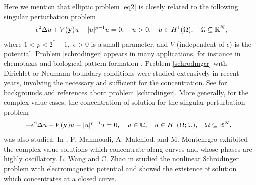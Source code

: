 \documentclass[10pt, reqno]{amsart}
\numberwithin{equation}{section}
\theoremstyle{definition}
\begin{document}
 Here we mention that elliptic problem \eqref{eq2} is closely related to the following singular perturbation problem
\begin{align} \label{schrodinger}
 - \epsilon^2 \Delta u + V({\bf y}) u - | u|^{p-1} u = 0, \quad u>0, \quad u \in H^1(\Omega), \quad \Omega \subseteq {\mathbb R}^N,
\end{align}
where $1<p<2^*-1, $ $\epsilon >0$ is a small parameter, and $V$ (independent of $\epsilon$) is the potential.
Problem \eqref{schrodinger} appears in many applications, for instance in chemotaxis \cite{LinNiTak1988} and biological pattern formation \cite{Gierer-Meinhardt}.
Problem \eqref{schrodinger} with Dirichlet or Neumann boundary conditions were studied
extensively in recent years, involving the necessary and sufficient for the concentration.
See \cite{AMNconjecture1, AMNconjecture2, Ambrosetti, AmbMalSecc2001,
BP, BP1, BP2, CPY2019, DY10,
delPFelmer1996, delPFelmer1997, delPKowWei1,
FloerWein1986,
GuoYang,
WangWeiYang, WeiYang, Wei-xu-yang, SWei-Yang}
for backgrounds and references about problem \eqref{schrodinger}.
More generally, for the complex value cases, the concentration of solution for the singular perturbation problem
\begin{align} \label{schrodingercomplexvalue}
 - \epsilon^2 \Delta u + V({\bf y}) u - | u|^{p-1} u = 0, \quad u\in \mathbb{C}, \quad u \in H^1(\Omega; \mathbb{C}), \quad \Omega \subseteq {\mathbb R}^N,
\end{align}
 was also studied.
 In \cite{machiodi}, F. Mahmoudi, A. Malchiodi and M. Montenegro exhibited the complex value solutions which concentrate along curves and whose phases are highly oscillatory. L. Wang and C. Zhao in \cite{Wangzhao} studied the nonlinear Schr\"{o}dinger problem with electromagnetic potential and showed the existence of solution which concentrates at a closed curve.
\end{document}
